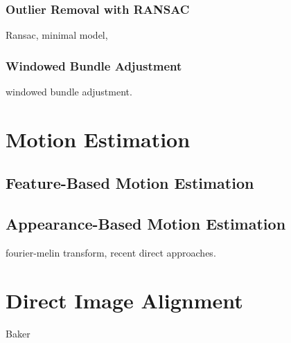 \subsubsection{Outlier Removal with RANSAC}%
\label{ssub:ransac}

Ransac, minimal model,

\subsubsection{Windowed Bundle Adjustment}%
\label{ssub:windowed-ba}

windowed bundle adjustment.


\section{Motion Estimation}%
\label{sec:motion-estimation}

\subsection{Feature-Based Motion Estimation}%
\label{sub:feature-based}

\subsection{Appearance-Based Motion Estimation}%
\label{sub:appearance-based}

fourier-melin transform,
recent direct approaches.

\section{Direct Image Alignment}%
\label{sec:direct-image-alignment}

Baker



%
%

